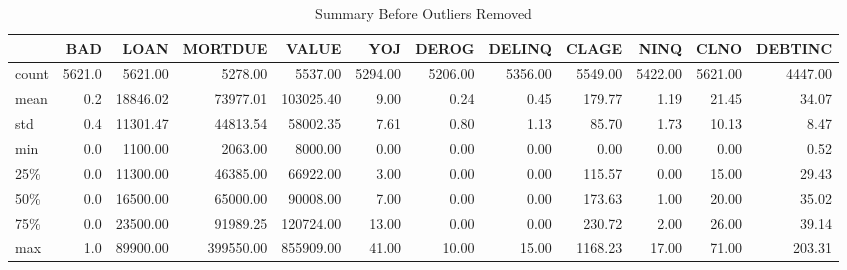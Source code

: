 \begin{appendices}
\begin{landscape}
\begin{table}[ht]
	\centering
	\renewcommand{\arraystretch}{2}
	\begin{tabular}{lrrrrrrrrrrr}
	\toprule
	{} &     BAD &      LOAN &    MORTDUE &      VALUE &      YOJ &    DEROG &   DELINQ &    CLAGE &     NINQ &     CLNO &  DEBTINC \\
	\midrule
	count &  5621.0 &   5621.00 &    5278.00 &    5537.00 &  5294.00 &  5206.00 &  5356.00 &  5549.00 &  5422.00 &  5621.00 &  4447.00 \\
	mean  &     0.2 &  18846.02 &   73977.01 &  103025.40 &     9.00 &     0.24 &     0.45 &   179.77 &     1.19 &    21.45 &    34.07 \\
	std   &     0.4 &  11301.47 &   44813.54 &   58002.35 &     7.61 &     0.80 &     1.13 &    85.70 &     1.73 &    10.13 &     8.47 \\
	min   &     0.0 &   1100.00 &    2063.00 &    8000.00 &     0.00 &     0.00 &     0.00 &     0.00 &     0.00 &     0.00 &     0.52 \\
	25\%   &     0.0 &  11300.00 &   46385.00 &   66922.00 &     3.00 &     0.00 &     0.00 &   115.57 &     0.00 &    15.00 &    29.43 \\
	50\%   &     0.0 &  16500.00 &   65000.00 &   90008.00 &     7.00 &     0.00 &     0.00 &   173.63 &     1.00 &    20.00 &    35.02 \\
	75\%   &     0.0 &  23500.00 &   91989.25 &  120724.00 &    13.00 &     0.00 &     0.00 &   230.72 &     2.00 &    26.00 &    39.14 \\
	max   &     1.0 &  89900.00 &  399550.00 &  855909.00 &    41.00 &    10.00 &    15.00 &  1168.23 &    17.00 &    71.00 &   203.31 \\
	\bottomrule
	\end{tabular}
	\caption{Summary Before Outliers Removed \label{SUM_BFR_TBL}}
\end{table}
\end{landscape}


\end{appendices}
